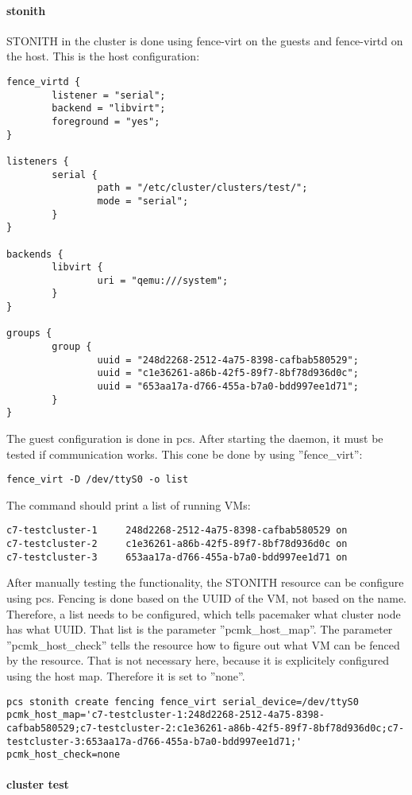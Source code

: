 \paragraph{stonith}
\ac{STONITH} in the cluster is done using fence-virt on the guests and fence-virtd on
the host.
This is the host configuration:
\begin{lstlisting}
fence_virtd {
        listener = "serial";
        backend = "libvirt";
        foreground = "yes";
}

listeners {
        serial {
                path = "/etc/cluster/clusters/test/";
                mode = "serial";
        }
}

backends {
        libvirt { 
                uri = "qemu:///system";
        }
}

groups {
        group {
                uuid = "248d2268-2512-4a75-8398-cafbab580529";
                uuid = "c1e36261-a86b-42f5-89f7-8bf78d936d0c";
                uuid = "653aa17a-d766-455a-b7a0-bdd997ee1d71";
        }
}

\end{lstlisting}
The guest configuration is done in pcs. After starting the daemon, it must be tested
if communication works. This cone be done by using ''fence\_virt'':
\begin{lstlisting}
fence_virt -D /dev/ttyS0 -o list
\end{lstlisting}
The command should print a list of running \acp{VM}:
\begin{lstlisting}
c7-testcluster-1     248d2268-2512-4a75-8398-cafbab580529 on
c7-testcluster-2     c1e36261-a86b-42f5-89f7-8bf78d936d0c on
c7-testcluster-3     653aa17a-d766-455a-b7a0-bdd997ee1d71 on
\end{lstlisting}
After manually testing the functionality, the \ac{STONITH} resource can be configure
using pcs. Fencing is done based on the \ac{UUID} of the \ac{VM}, not based on the name.
Therefore, a list needs to be configured, which tells pacemaker what cluster node has what 
\ac{UUID}. That list is the parameter ''pcmk\_host\_map''. The parameter ''pcmk\_host\_check'' tells
the resource how to figure out what \acs{VM} can be fenced by the resource. That is not necessary here,
because it is explicitely configured using the host map. Therefore it is set to ''none''.
\begin{lstlisting}
pcs stonith create fencing fence_virt serial_device=/dev/ttyS0 pcmk_host_map='c7-testcluster-1:248d2268-2512-4a75-8398-cafbab580529;c7-testcluster-2:c1e36261-a86b-42f5-89f7-8bf78d936d0c;c7-testcluster-3:653aa17a-d766-455a-b7a0-bdd997ee1d71;' pcmk_host_check=none
\end{lstlisting}
\paragraph{cluster test}

